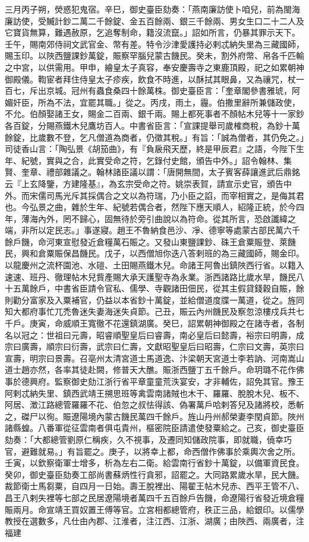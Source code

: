 \begin{pinyinscope}
 三月丙子朔，熒惑犯鬼宿。辛巳，御史臺臣劾奏：「燕南廉訪使卜咱兒，前為閩海廉訪使，受贓計鈔二萬二千餘錠、金五百餘兩、銀三千餘兩、男女生口二十二人及它寶貨無算，難遇赦原，乞追奪制命，籍沒流竄。」詔如所言，仍暴其罪示天下。壬午，賜南郊侍祠文武官金、幣有差。特令沙津愛護持必剌忒納失里為三藏國師，賜玉印。以陜西鹽課鈔萬錠，賑察罕腦兒蒙古饑民。癸未，割外府幣、帛各千匹輸之中宮，以供需用。甲申，繪皇太子真容，奉安慶壽寺之東鹿頂殿，祀之如累朝神御殿儀。鞫宦者拜住侍皇太子疹疾，飲食不時進，以酥拭其眼鼻，又為禳咒，杖一百七，斥出京城。冠州有蟲食桑四十餘萬株。御史臺臣言：「奎章閣參書雅琥，阿媚奸臣，所為不法，宜罷其職。」從之。丙戌，雨土，霾。伯撒里辭所兼儲政使，不允。伯顏娶諸王女，賜金二百兩、銀千兩。賜上都死事者不顏帖木兒等十一家鈔各百錠，分賜燕鐵木兒鷹坊百人。中書省臣言：「宣課提舉司歲榷商稅，為鈔十萬餘錠，比歲數不登，乞凡僧道為商者，仍徵其稅。」有旨：「誠為僧者，其仍免之。」司徒香山言：「陶弘景《胡笳曲》，有『負扆飛天歷，終是甲辰君』之語，今陛下生年、紀號，實與之合，此實受命之符，乞錄付史館，頒告中外。」詔令翰林、集賢、奎章、禮部雜議之。翰林諸臣議以謂：「唐開無間，太子賓客薛讓進武后鼎銘云『上玄降鑒，方建隆基』，為玄宗受命之符。姚崇表賀，請宣示史官，頒告中外。而宋儒司馬光斥其採偶合之文以為符瑞，乃小臣之諂，而宰相實之，是侮其君也。今弘景之曲，雜於生年、紀號若偶合者，然陛下應天順人，紹隆正統，於今四年，薄海內外，罔不歸心，固無待於旁引曲說以為符命。從其所言，恐啟讖緯之端，非所以定民志。」事遂寢。趙王不魯納食邑沙、凈、德寧等處蒙古部民萬六千餘戶饑，命河東宣慰發近倉糧萬石賑之。又發山東鹽課鈔、硃王倉粟賑登、萊饑民，興和倉粟賑保昌饑民。戊子，以西僧旭你迭八答剌班的為三藏國師，賜金印。以龍慶州之流杯園池、水磑、土田賜燕鐵木兒。命諸王阿魯出鎮陜西行省。以籍入速速、班丹、徹理帖木兒貲產賜大承天護聖寺為永業。浙西諸路比歲水旱，饑民八十五萬餘戶，中書省臣請令官私、儒學、寺觀諸田佃民，從其主假貸錢穀自賑，餘則勸分富家及入粟補官，仍益以本省鈔十萬錠，並給僧道度牒一萬道，從之。旌同知大都府事忙兀禿魯迷失妻海迷失貞節。己丑，賑云內州饑民及察忽涼樓戍兵共七千戶。庚寅，命威順王寬徹不花還鎮湖廣。癸巳，詔累朝神御殿之在諸寺者，各制名以冠之：世祖曰元壽，昭睿順聖皇后曰睿壽，南必皇后曰懿壽，裕宗曰明壽，成宗曰廣壽，順宗曰衍壽，武宗曰仁壽，文獻昭聖皇后曰昭壽，仁宗曰文壽，英宗曰宣壽，明宗曰景壽。召亳州太清宮道士馬道逸、汴梁朝天宮道士李若訥、河南嵩山道士趙亦然，各率其徒赴闕，修普天大醮。賑浙西鹽丁五千餘戶。命玥璐不花作佛事於德興府。監察御史劾江浙行省平章童童荒泆宴安，才非輔佐，詔免其官。豫王阿剌忒納失里、鎮西武靖王搠思班等禽雲南諸賊也木干、羅羅、脫脫木兒、板不、阿居、澂江路總管羅羅不花、伯忽之叔怯得該、偽署萬戶哈剌答兒及諸將校，悉斬之，磔尸以徇。賑遼陽境內蒙古饑民萬四千餘戶。旌山丹州郝榮妻李閏貞節。陜州諸縣蝗。八番軍從征雲南者俱屯貴州，樞密院臣請遣使發粟給之。己亥，御史臺臣劾奏：「大都總管劉原仁稱疾，久不視事，及遷同知儲政院事，即就職，僥幸巧官，避難就易。」有旨罷之。庚子，以將幸上都，命西僧作佛事於乘輿次舍之所。壬寅，以欽察衛軍士增多，析為左右二衛。給雲南行省鈔十萬錠，以備軍資民食。癸卯，御史臺臣劾奏工部尚書蘇炳性行貪邪，詔罷之。大同路累歲水旱，民大饑。裁節衛士馬芻粟，自四月一日始。壽王脫裡出、陽翟王帖木兒赤、西平王管不八、昌王八剌失裡等七部之民居遼陽境者萬四千五百餘戶告饑，命遼陽行省發近境倉糧賑兩月。命宣靖王買奴置王傅等官。立宮相都總管府，秩正三品，給銀印。以儒學教授在選數多，凡仕由內郡、江淮者，注江西、江浙、湖廣；由陜西、兩廣者，注福建
\end{pinyinscope}
